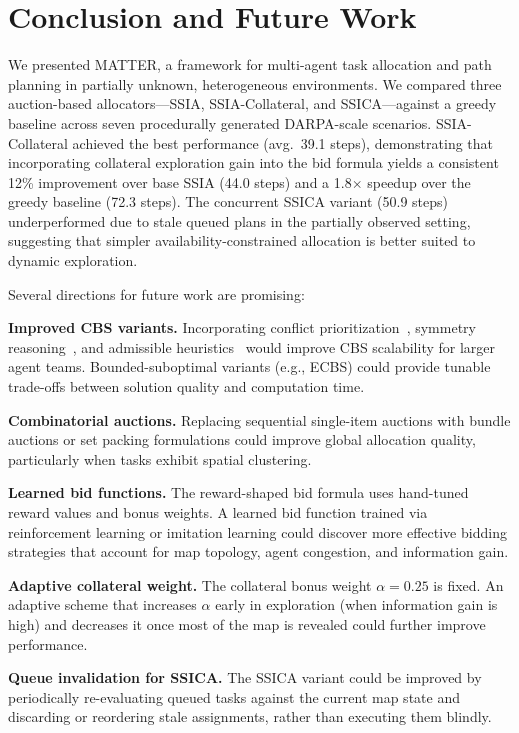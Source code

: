 \documentclass[conference]{IEEEtran}
\begin{document}
\section{Conclusion and Future Work}

We presented MATTER, a framework for multi-agent task allocation and path planning in partially unknown, heterogeneous environments. We compared three auction-based allocators---SSIA, SSIA-Collateral, and SSICA---against a greedy baseline across seven procedurally generated DARPA-scale scenarios. SSIA-Collateral achieved the best performance (avg.\ 39.1 steps), demonstrating that incorporating collateral exploration gain into the bid formula yields a consistent 12\% improvement over base SSIA (44.0 steps) and a 1.8$\times$ speedup over the greedy baseline (72.3 steps). The concurrent SSICA variant (50.9 steps) underperformed due to stale queued plans in the partially observed setting, suggesting that simpler availability-constrained allocation is better suited to dynamic exploration.

Several directions for future work are promising:

\textbf{Improved CBS variants.} Incorporating conflict prioritization~\cite{boyarski2015icbs}, symmetry reasoning~\cite{li2021symmetry}, and admissible heuristics~\cite{felner2018heuristics} would improve CBS scalability for larger agent teams. Bounded-suboptimal variants (e.g., ECBS) could provide tunable trade-offs between solution quality and computation time.

\textbf{Combinatorial auctions.} Replacing sequential single-item auctions with bundle auctions or set packing formulations could improve global allocation quality, particularly when tasks exhibit spatial clustering.

\textbf{Learned bid functions.} The reward-shaped bid formula uses hand-tuned reward values and bonus weights. A learned bid function trained via reinforcement learning or imitation learning could discover more effective bidding strategies that account for map topology, agent congestion, and information gain.

\textbf{Adaptive collateral weight.} The collateral bonus weight $\alpha = 0.25$ is fixed. An adaptive scheme that increases $\alpha$ early in exploration (when information gain is high) and decreases it once most of the map is revealed could further improve performance.

\textbf{Queue invalidation for SSICA.} The SSICA variant could be improved by periodically re-evaluating queued tasks against the current map state and discarding or reordering stale assignments, rather than executing them blindly.
\end{document}
